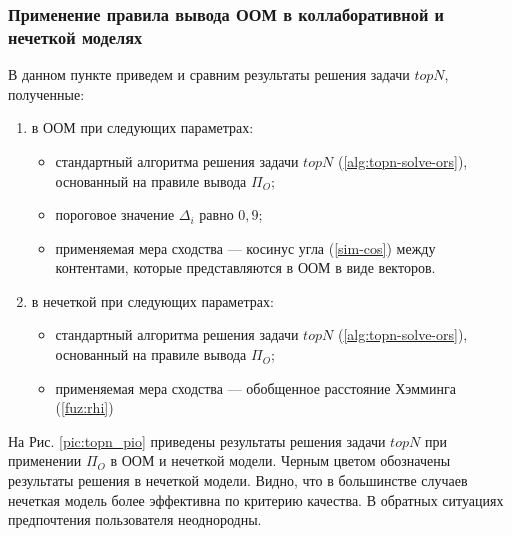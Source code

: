 \subsubsection{Применение правила вывода ООМ в коллаборативной и нечеткой
моделях}
В данном пункте приведем и сравним результаты решения задачи $topN$, полученные:
\begin{enumerate}
	\item  в ООМ при следующих параметрах:
		\begin{itemize}
			\item
			стандартный алгоритма решения задачи
			$topN$ (\ref{alg:topn-solve-ors}), основанный на
			правиле вывода $\Pi_O$;
			\item
			пороговое значение $\Delta_i$ равно $0,9$;
			\item
		применяемая мера сходства --- косинус угла (\ref{sim-cos})
		между контентами, которые представляются в ООМ в виде векторов.
		\end{itemize}
	\item в нечеткой при следующих параметрах:
		\begin{itemize}
			\item
			стандартный алгоритма решения задачи
			$topN$ (\ref{alg:topn-solve-ors}), основанный на
			правиле вывода $\Pi_O$;
			\item
				применяемая мера сходства --- обобщенное расстояние Хэмминга
				(\ref{fuz:rhi})
		\end{itemize}
\end{enumerate}

На Рис. \ref{pic:topn_pio} приведены результаты решения
задачи $topN$ при применении $\Pi_O$ в ООМ и нечеткой модели.
Черным цветом обозначены результаты решения в нечеткой модели.
Видно, что в большинстве случаев нечеткая модель более эффективна
по критерию качества. В обратных ситуациях предпочтения пользователя
неоднородны.

